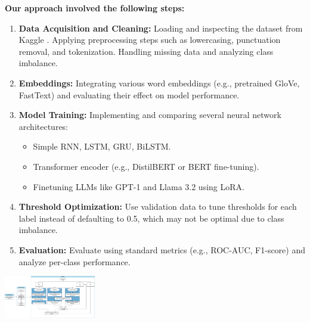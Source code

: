 

    {
        \textbf{Our approach involved the following steps:}
        \begin{enumerate}
            \item \textbf{Data Acquisition and Cleaning:} Loading and inspecting the dataset from Kaggle \cite{kaggle_toxic}. Applying preprocessing steps such as lowercasing, punctuation removal, and tokenization. Handling missing data and analyzing class imbalance.
            \item \textbf{Embeddings:} Integrating various word embeddings (e.g., pretrained GloVe, FastText) and evaluating their effect on model performance.
            \item \textbf{Model Training:} Implementing and comparing several neural network architectures:
                \begin{itemize}
                    \item Simple RNN, LSTM, GRU, BiLSTM.
                    \item Transformer encoder (e.g., DistilBERT or BERT fine-tuning).
                    \item Finetuning LLMs like GPT-1 and Llama 3.2 using LoRA.
                \end{itemize}
            \item \textbf{Threshold Optimization:} Use validation data to tune thresholds for each label instead of defaulting to 0.5, which may not be optimal due to class imbalance.
            \item \textbf{Evaluation:} Evaluate using standard metrics (e.g., ROC-AUC, F1-score) and analyze per-class performance.
        \end{enumerate}

        \begin{center}
            \includegraphics[width=0.3\textwidth]{figures/flowchat.png}
            \label{fig:model_pipeline}
        \end{center}
        }

